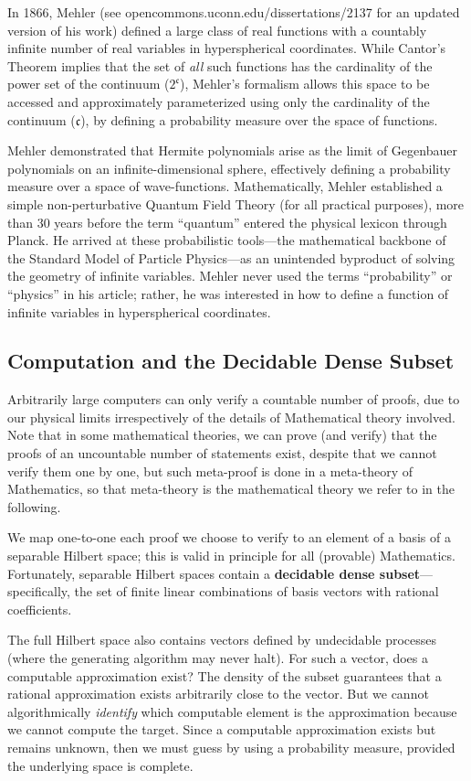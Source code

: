 \documentclass{stex}
\begin{document}
In 1866, Mehler (see opencommons.uconn.edu/dissertations/2137 for an updated version of his work) defined a large class of real functions with a countably infinite number of real variables in hyperspherical coordinates. While Cantor's Theorem implies that the set of \textit{all} such functions has the cardinality of the power set of the continuum ($2^{\mathfrak{c}}$), Mehler's formalism allows this space to be accessed and approximately parameterized using only the cardinality of the continuum ($\mathfrak{c}$), by defining a probability measure over the space of functions.

Mehler demonstrated that Hermite polynomials arise as the limit of Gegenbauer polynomials on an infinite-dimensional sphere, effectively defining a probability measure over a space of wave-functions. Mathematically, Mehler established a simple non-perturbative Quantum Field Theory (for all practical purposes), more than 30 years before the term ``quantum'' entered the physical lexicon through Planck. He arrived at these probabilistic tools---the mathematical backbone of the Standard Model of Particle Physics---as an unintended byproduct of solving the geometry of infinite variables. Mehler never used the terms ``probability'' or ``physics'' in his article; rather, he was interested in how to define a function of infinite variables in hyperspherical coordinates.

\subsection{Computation and the Decidable Dense Subset}

Arbitrarily large computers can only verify a countable number of proofs, due to our physical limits irrespectively of the details of Mathematical theory involved. Note that in some mathematical theories, we can prove (and verify) that the proofs of an uncountable number of statements exist, despite that we cannot verify them one by one, but such meta-proof is done in a meta-theory of Mathematics, so that meta-theory is the mathematical theory we refer to in the following.

We map one-to-one each proof we choose to verify to an element of a basis of a separable Hilbert space; this is valid in principle for all (provable) Mathematics. Fortunately, separable Hilbert spaces contain a \textbf{decidable dense subset}---specifically, the set of finite linear combinations of basis vectors with rational coefficients.

The full Hilbert space also contains vectors defined by undecidable processes (where the generating algorithm may never halt). For such a vector, does a computable approximation exist? The density of the subset guarantees that a rational approximation exists arbitrarily close to the vector. But we cannot algorithmically \textit{identify} which computable element is the approximation because we cannot compute the target. Since a computable approximation exists but remains unknown, then we must guess by using a probability measure, provided the underlying space is complete.
\end{document}

